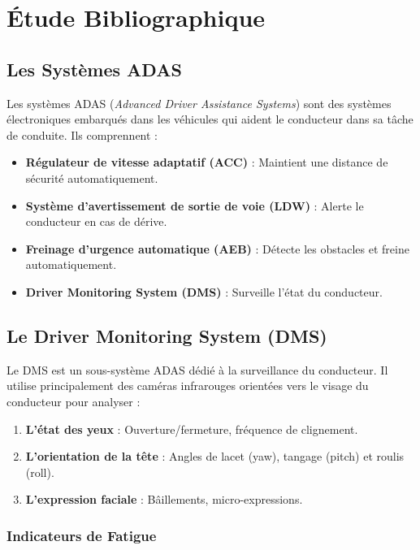 \documentclass[12pt,a4paper]{report}
\begin{document}
\chapter{Étude Bibliographique}

\section{Les Systèmes ADAS}

Les systèmes ADAS (\textit{Advanced Driver Assistance Systems}) sont des systèmes électroniques embarqués dans les véhicules qui aident le conducteur dans sa tâche de conduite. Ils comprennent :

\begin{itemize}
    \item \textbf{Régulateur de vitesse adaptatif (ACC)} : Maintient une distance de sécurité automatiquement.
    \item \textbf{Système d'avertissement de sortie de voie (LDW)} : Alerte le conducteur en cas de dérive.
    \item \textbf{Freinage d'urgence automatique (AEB)} : Détecte les obstacles et freine automatiquement.
    \item \textbf{Driver Monitoring System (DMS)} : Surveille l'état du conducteur.
\end{itemize}

\section{Le Driver Monitoring System (DMS)}

Le DMS est un sous-système ADAS dédié à la surveillance du conducteur. Il utilise principalement des caméras infrarouges orientées vers le visage du conducteur pour analyser :

\begin{enumerate}
    \item \textbf{L'état des yeux} : Ouverture/fermeture, fréquence de clignement.
    \item \textbf{L'orientation de la tête} : Angles de lacet (yaw), tangage (pitch) et roulis (roll).
    \item \textbf{L'expression faciale} : Bâillements, micro-expressions.
\end{enumerate}

\subsection{Indicateurs de Fatigue}
\end{document}

